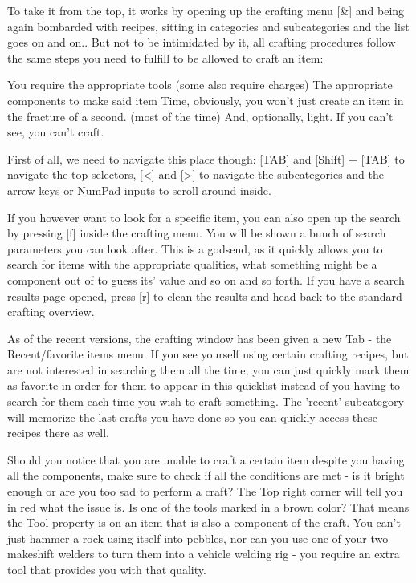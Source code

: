 To take it from the top, it works by opening up the crafting menu [\&] and being again bombarded with recipes, sitting in categories and subcategories and the list goes on and on.. But not to be intimidated by it, all crafting procedures follow the same steps you need to fulfill to be allowed to craft an item:

You require the appropriate tools (some also require charges)
The appropriate components to make said item
Time, obviously, you won't just create an item in the fracture of a second. (most of the time)
And, optionally, light. If you can't see, you can't craft.

First of all, we need to navigate this place though: [TAB] and [Shift] + [TAB] to navigate the top selectors, [<] and [>] to navigate the subcategories and the arrow keys or NumPad inputs to scroll around inside.

If you however want to look for a specific item, you can also open up the search by pressing [f] inside the crafting menu. You will be shown a bunch of search parameters you can look after. This is a godsend, as it quickly allows you to search for items with the appropriate qualities, what something might be a component out of to guess its' value and so on and so forth. If you have a search results page opened, press [r] to clean the results and head back to the standard crafting overview.

As of the recent versions, the crafting window has been given a new Tab - the Recent/favorite items menu. If you see yourself using certain crafting recipes, but are not interested in searching them all the time, you can just quickly mark them as favorite in order for them to appear in this quicklist instead of you having to search for them each time you wish to craft something. The 'recent' subcategory will memorize the last crafts you have done so you can quickly access these recipes there as well.

Should you notice that you are unable to craft a certain item despite you having all the components, make sure to check if all the conditions are met - is it bright enough or are you too sad to perform a craft? The Top right corner will tell you in red what the issue is. Is one of the tools marked in a brown color? That means the Tool property is on an item that is also a component of the craft. You can't just hammer a rock using itself into pebbles, nor can you use one of your two makeshift welders to turn them into a vehicle welding rig - you require an extra tool that provides you with that quality.

